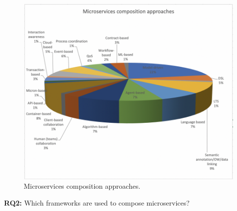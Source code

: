 \documentclass{article}
\begin{document}
\begin{multicols}{2}
\begin{figure}[htbp]
 \centerline{\includegraphics[scale=0.60]{mscomappr.png}}
  \caption{Microservices composition approaches.}
  \label{fig}
\end{figure}

\textbf{RQ2:} Which frameworks are used to compose microservices?


\end{multicols}
\end{document}

